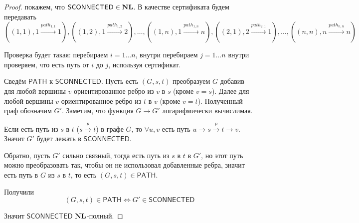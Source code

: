 \begin{proof}
    покажем, что $\mathsf{SCONNECTED}\in\textbf{NL}$. В качестве сертификата будем передавать
    \[((1, 1),1\xrightarrow{path_{1,1}}1), ((1, 2),1\xrightarrow{path_{1,2}}2),\ldots, ((1, n),1\xrightarrow{path_{1,n}}n), ((2, 1),2\xrightarrow{path_{2,1}}1),\ldots,((n, n),n\xrightarrow{path_{n,n}}n)\]
    
    Проверка будет такая: перебираем $i=1\ldots n$, внутри перебираем $j=1\ldots n$ 
    внутри проверяем, что есть путь от $i$ до $j$, используя сертификат.
    
    Сведём $\mathsf{PATH}$ к $\mathsf{SCONNECTED}$. Пусть есть $(G,s,t)$ преобразуем $G$ добавив для любой вершины $v$ ориентированное ребро из $v$ в $s$ (кроме $v=s$). Далее для любой вершины $v$ ориентированное ребро из $t$ в $v$ (кроме $v=t$). Полученный граф обозначим $G'$. Заметим, что функция $G\to G'$ логарифмически вычислимая.
    
    Если есть путь из $s$ в $t$ ($s\xrightarrow{p}t$) в графе $G$, то $\forall u,v$ есть путь $u\rightarrow s\xrightarrow{p}t\rightarrow v$. Значит $G'$ будет лежать в $\mathsf{SCONNECTED}$.
    
    Обратно, пусть $G'$ сильно связный, тогда есть путь из $s$ в $t$ в $G'$, но этот путь можно преобразовать так, чтобы он не использовал добавленные ребра, значит есть путь в $G$ из $s$ в $t$, то есть $(G,s,t)\in\mathsf{PATH}$.
    
    Получили
    \[(G,s,t)\in\mathsf{PATH}\iff G' \in \mathsf{SCONNECTED}\]
    
    Значит $\mathsf{SCONNECTED}$ $\textbf{NL}$-полный.
\end{proof} 